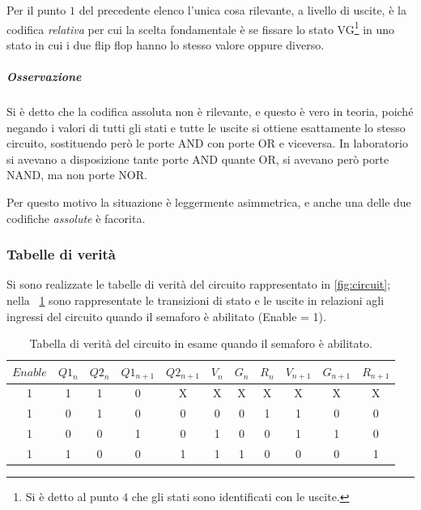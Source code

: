 \documentclass[a4paper,10pt]{article}
\begin{document}
Per il punto $ 1 $ del precedente elenco l'unica cosa rilevante, a livello di uscite, è la codifica \textit{relativa} per cui la scelta fondamentale è se fissare lo stato VG\footnote{Si è detto al punto $ 4 $ che gli stati sono identificati con le uscite.} in uno stato in cui i due flip flop hanno lo stesso valore oppure diverso.

\subparagraph{Osservazione} Si è detto che la codifica assoluta non è rilevante, e questo è vero in teoria, poiché negando i valori di tutti gli stati e tutte le uscite si ottiene esattamente lo stesso circuito, sostituendo però le porte AND con porte OR e viceversa. In laboratorio si avevano a disposizione tante porte AND quante OR, si avevano però porte NAND, ma non porte NOR.

Per questo motivo la situazione è leggermente asimmetrica, e anche una delle due codifiche \textit{assolute} è facorita.

\subsubsection{Tabelle di verità}
Si sono realizzate le tabelle di verità del circuito rappresentato in \cref{fig:circuit}; nella \tablename{~\ref{tab:sem1}} sono rappresentate le transizioni di stato e le uscite in relazioni agli ingressi del circuito quando il semaforo è abilitato (Enable = 1).


\begin{table}[H]
	\centering
	\begin{tabular}{c|cc|cc|ccc|ccc}
		\hline
		$Enable$ & $Q1_n$ &	$Q2_n$ & $Q1_{n+1}$ & $Q2_{n+1}$ & $V_n$ & $G_n$ & $R_n$ & $V_{n+1}$ & $G_{n+1}$ & $R_{n+1}$ \\
		\hline
		1 & 1 & 1 & 0 & X & X & X & X & X & X & X \\
		\hline
		1 & 0 & 1 & 0 & 0 & 0 & 0 & 1 & 1 & 0 & 0 \\
		1 & 0 & 0 & 1 & 0 & 1 & 0 & 0 & 1 & 1 & 0 \\
		1 & 1 & 0 & 0 & 1 & 1 & 1 & 0 & 0 & 0 & 1 \\
		\hline
	\end{tabular}
	\caption[Semaforo Abilitato]{Tabella di verità del circuito in esame quando il semaforo è abilitato\footnotemark.}
	\label{tab:sem1}
\end{table}
\end{document}
